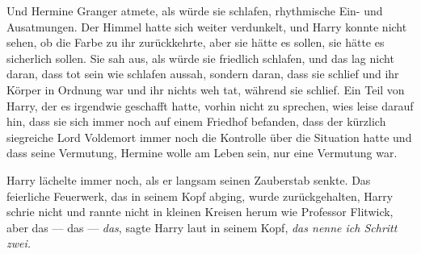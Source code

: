 Und Hermine Granger atmete, als würde sie schlafen, rhythmische Ein- und Ausatmungen. Der Himmel hatte sich weiter verdunkelt, und Harry konnte nicht sehen, ob die Farbe zu ihr zurückkehrte, aber sie hätte es sollen, sie hätte es sicherlich sollen. Sie sah aus, als würde sie friedlich schlafen, und das lag nicht daran, dass tot sein wie schlafen aussah, sondern daran, dass sie schlief und ihr Körper in Ordnung war und ihr nichts weh tat, während sie schlief.
Ein Teil von Harry, der es irgendwie geschafft hatte, vorhin nicht zu sprechen, wies leise darauf hin, dass sie sich immer noch auf einem Friedhof befanden, dass der kürzlich siegreiche Lord Voldemort immer noch die Kontrolle über die Situation hatte und dass seine Vermutung, Hermine wolle am Leben sein, nur eine Vermutung war.

Harry lächelte immer noch, als er langsam seinen Zauberstab senkte. Das feierliche Feuerwerk, das in seinem Kopf abging, wurde zurückgehalten, Harry schrie nicht und rannte nicht in kleinen Kreisen herum wie Professor Flitwick, aber das —
das —
\emph{\emph{das}}, sagte Harry laut in seinem Kopf, \emph{\emph{das} nenne ich Schritt zwei.}

